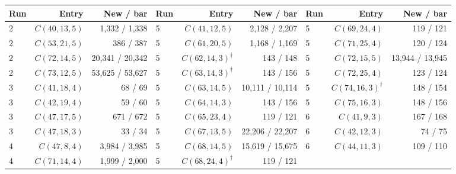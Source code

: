 \documentclass[11pt,letterpaper]{article}
\begin{document}
\par\vspace{4pt}
\noindent\begin{minipage}{\linewidth}
\centering
{}\label{tab:all}
\footnotesize
\renewcommand{\arraystretch}{1.0}
\setlength{\tabcolsep}{3.5pt}
\begin{tabular}{@{}lrr@{\hspace{1.5em}}lrr@{\hspace{1.5em}}lrr@{}}
\toprule
Run & Entry & New / bar & Run & Entry & New / bar & Run & Entry & New / bar\\
\midrule
2 & $C(40,13,5)$ & 1,332 / 1,338 & 5 & $C(41,12,5)$ & 2,128 / 2,207 & 5 & $C(69,24,4)$ & 119 / 121\\
2 & $C(53,21,5)$ & 386 / 387 & 5 & $C(61,20,5)$ & 1,168 / 1,169 & 5 & $C(71,25,4)$ & 120 / 124\\
2 & $C(72,14,5)$ & 20,341 / 20,342 & 5 & $C(62,14,3)^\dagger$ & 143 / 148 & 5 & $C(72,15,5)$ & 13,944 / 13,945\\
2 & $C(73,12,5)$ & 53,625 / 53,627 & 5 & $C(63,14,3)^\dagger$ & 143 / 156 & 5 & $C(72,25,4)$ & 123 / 124\\
3 & $C(41,18,4)$ & 68 / 69 & 5 & $C(63,14,5)$ & 10,111 / 10,114 & 5 & $C(74,16,3)^\dagger$ & 148 / 154\\
3 & $C(42,19,4)$ & 59 / 60 & 5 & $C(64,14,3)$ & 143 / 156 & 5 & $C(75,16,3)$ & 148 / 156\\
3 & $C(47,17,5)$ & 671 / 672 & 5 & $C(65,23,4)$ & 119 / 121 & 6 & $C(41,9,3)$ & 167 / 168\\
3 & $C(47,18,3)$ & 33 / 34 & 5 & $C(67,13,5)$ & 22,206 / 22,207 & 6 & $C(42,12,3)$ & 74 / 75\\
4 & $C(47,8,4)$ & 3,984 / 3,985 & 5 & $C(68,14,5)$ & 15,619 / 15,675 & 6 & $C(44,11,3)$ & 109 / 110\\
4 & $C(71,14,4)$ & 1,999 / 2,000 & 5 & $C(68,24,4)^\dagger$ & 119 / 121 & & &\\
\bottomrule
\end{tabular}
\end{minipage}
\vspace{2pt}
\end{document}
